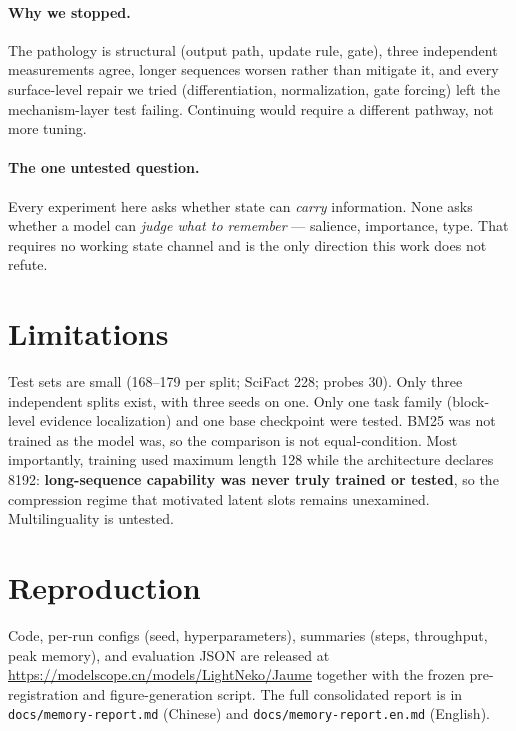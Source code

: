 \documentclass[10pt,twocolumn,letterpaper]{article}
\begin{document}
\paragraph{Why we stopped.} The pathology is structural (output path, update
rule, gate), three independent measurements agree, longer sequences worsen
rather than mitigate it, and every surface-level repair we tried
(differentiation, normalization, gate forcing) left the mechanism-layer test
failing. Continuing would require a different pathway, not more tuning.

\paragraph{The one untested question.} Every experiment here asks whether
state can \emph{carry} information. None asks whether a model can \emph{judge
what to remember} --- salience, importance, type. That requires no working
state channel and is the only direction this work does not refute.

\section{Limitations}
\label{sec:limits}

Test sets are small (168--179 per split; SciFact 228; probes 30). Only three
independent splits exist, with three seeds on one. Only one task family
(block-level evidence localization) and one base checkpoint were tested. BM25
was not trained as the model was, so the comparison is not
equal-condition. Most importantly, training used maximum length 128 while the
architecture declares 8192: \textbf{long-sequence capability was never truly
trained or tested}, so the compression regime that motivated latent slots
remains unexamined. Multilinguality is untested.

\section{Reproduction}

Code, per-run configs (seed, hyperparameters), summaries (steps, throughput,
peak memory), and evaluation JSON are released at
\url{https://modelscope.cn/models/LightNeko/Jaume} together with the frozen
pre-registration and figure-generation script. The full consolidated report is
in \texttt{docs/memory-report.md} (Chinese) and
\texttt{docs/memory-report.en.md} (English).
\end{document}
